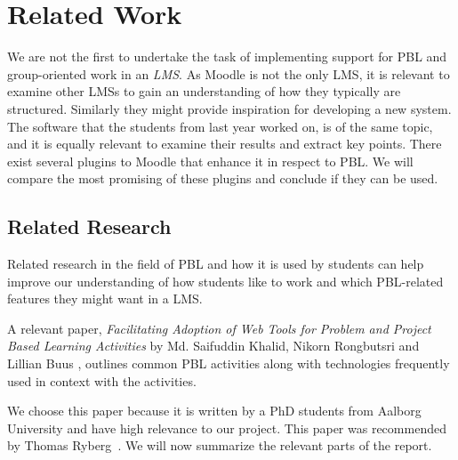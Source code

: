 \chapter{Related Work}
\label{chap:relatedwork}
We are not the first to undertake the task of implementing support for PBL and group-oriented work in an \textit{LMS}. 
As Moodle is not the only LMS, it is relevant to examine other LMSs to gain an understanding of how they typically are structured. 
Similarly they might provide inspiration for developing a new system.
The software that the students from last year worked on, is of the same topic, and it is equally relevant to examine their results and extract key points.
There exist several plugins to Moodle that enhance it in respect to PBL. 
We will compare the most promising of these plugins and conclude if they can be used.

\section{Related Research}
\label{sec:research}
Related research in the field of PBL and how it is used by students can help improve our understanding of how students like to work and which PBL-related features they might want in a LMS.
 
A relevant paper, \textit{Facilitating Adoption of Web Tools for Problem and Project Based Learning Activities} by Md. Saifuddin Khalid, Nikorn Rongbutsri and Lillian Buus \citep{khalidRongbutsriBuus}, outlines common PBL activities along with technologies frequently used in context with the activities.

We choose this paper because it is written by a PhD students from Aalborg University and have high relevance to our project. This paper was recommended by Thomas Ryberg~\cite{thomas}. We will now summarize the relevant parts of the report.  


